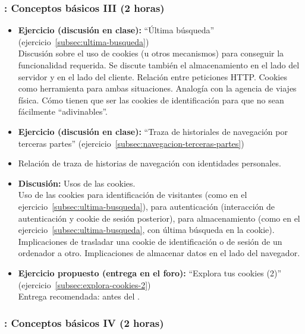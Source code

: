 \documentclass[a4paper,12pt]{article}
\begin{document}
\subsubsection{\juevesC: Conceptos básicos III (2 horas)}
\label{cal:juevesC}

\begin{itemize}
\item \textbf{Ejercicio (discusión en clase):} ``Última búsqueda'' (ejercicio~\ref{subsec:ultima-busqueda}) \\
  Discusión sobre el uso de cookies (u otros mecanismos) para conseguir la funcionalidad requerida. Se discute también el almacenamiento en el lado del servidor y en el lado del cliente. Relación entre peticiones HTTP. Cookies como herramienta para ambas situaciones. Analogía con la agencia de viajes física. Cómo tienen que ser las cookies de identificación para que no sean fácilmente ``adivinables''.
  \item \textbf{Ejercicio (discusión en clase):} ``Traza de historiales de navegación por terceras partes'' (ejercicio~\ref{subsec:navegacion-terceras-partes})
\item Relación de traza de historias de navegación con identidades personales.
\item \textbf{Discusión:} Usos de las cookies. \\
  Uso de las cookies para identificación de visitantes (como en el ejercicio~\ref{subsec:ultima-busqueda}), para autenticación (interacción de autenticación y cookie de sesión posterior), para almacenamiento (como en el ejercicio~\ref{subsec:ultima-busqueda}, con última búsqueda en la cookie). Implicaciones de trasladar una cookie de identificación o de sesión de un ordenador a otro. Implicaciones de almacenar datos en el lado del navegador.
\item \textbf{Ejercicio propuesto (entrega en el foro):} ``Explora tus cookies (2)'' (ejercicio~\ref{subsec:explora-cookies-2}) \\
  Entrega recomendada: antes del \juevesD.
\end{itemize}


\subsubsection{\juevesD: Conceptos básicos IV (2 horas)}
\label{cal:juevesD}
\end{document}
